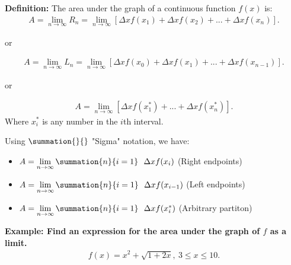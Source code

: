 \documentclass{report}
\begin{document}
\bigbreak \noindent \bigbreak \noindent 
\begin{mdframed}
  \textbf{Definition:}
  \bigbreak \noindent 
  The area under the graph of a continuous function $f(x)$ is:
  \begin{align*}
    A = \lim_{n \to \infty}{R_{n}} = \lim_{n \to \infty}{[\Delta xf(x_{1}) + \Delta xf(x_{2}) + ... + \Delta xf(x_{n})]}
  .\end{align*}
  \begin{center}
    or
  \end{center}
  \begin{align*}
    A = \lim_{n \to \infty}{L_{n}} = \lim_{n \to \infty}{[\Delta xf(x_{0}) + \Delta xf(x_{1}) + ... + \Delta xf(x_{n-1})]}
  .\end{align*}
  \begin{center}
    or
  \end{center}
  \begin{align*}
    A = \lim_{n \to \infty}{[\Delta xf(x_{1}^{*}) + ... + \Delta xf(x_{n}^{*})]}
  .\end{align*}
  \bigbreak \noindent 
  Where $x_{i}^{*}$ is any number in the $i$th interval.

  \bigbreak \noindent 
  Using $\summation{}{}$ "Sigma" notation, we have:
  \begin{itemize}
    \item $A = \lim\limits_{n \to \infty}{\summation{n}{i=1}\ \ \Delta xf(x_{i})} $ (Right endpoints)
    \item $A = \lim\limits_{n \to \infty}{\summation{n}{i=1}\ \ \Delta xf(x_{i-1})} $ (Left endpoints)
    \item $A = \lim\limits_{n \to \infty}{\summation{n}{i=1}\ \ \Delta xf(x_{i}^{*})} $ (Arbitrary partiton)
  \end{itemize}
  \bigbreak \noindent 
  \bigbreak \noindent 
\end{mdframed}

\bigbreak \noindent 
\begin{mdframed}
  \textbf{Example: Find an expression for the area under the graph of $f$ as a limit.}
  \begin{align*}
    f(x) = x^{2}+ \sqrt{1+2x},\ 3\leq x \leq 10
  .\end{align*}
\end{mdframed}
\end{document}
